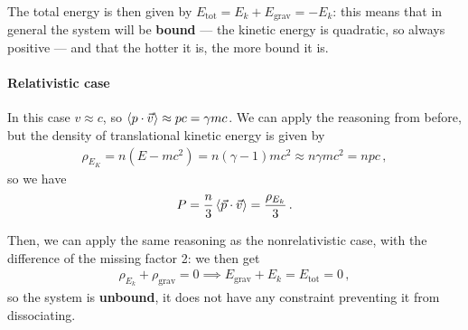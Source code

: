 \documentclass[main.tex]{subfiles}
\begin{document}
The total energy is then given by \(E _{\text{tot}} = E_k + E _{\text{grav}} = - E_k\): this means that in general the system will be \textbf{bound} --- the kinetic energy is quadratic, so always positive --- and that the hotter it is, the more bound it is.



\paragraph{Relativistic case}

In this case \(v \approx c\), so \(\expval{p \cdot \vec{v}} \approx pc = \gamma m c\). We can apply the reasoning from before, but the density of translational kinetic energy is given by 
%
\begin{align}
\rho_{E_K} = n (E - mc^2) = n (\gamma -1) mc^2 \approx n\gamma mc^2 = npc 
\,,
\end{align}
%
so we have 
%
\begin{align}
P = \frac{n}{3} \expval{\vec{p} \cdot \vec{v}} = \frac{\rho _{E_k}}{3}
\,.
\end{align}

Then, we can apply the same reasoning as the nonrelativistic case, with the difference of the missing factor 2: we then get 
%
\begin{align}
\rho_{E_k} + \rho_{\text{grav}} = 0 \implies
E _{\text{grav}} + E_k = E _{\text{tot}} = 0
\,,
\end{align}
%
so the system is \textbf{unbound}, it does not have any constraint preventing it from dissociating. 

\end{document}
